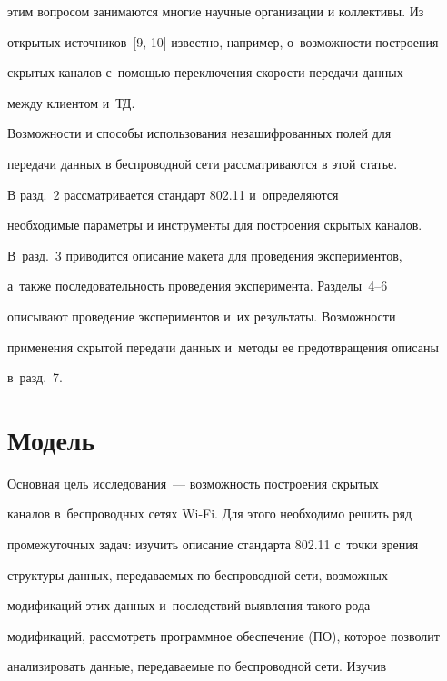 этим вопросом занимаются многие научные организации и коллективы. Из


открытых источников~[9, 10] известно, например, о~возможности построения


скрытых каналов с~по\-мощью переключения скорости передачи данных


между клиентом и~ТД.





  Возможности и способы использования незашифрованных полей для


передачи данных в беспроводной сети рассматриваются в этой статье.





  В разд.~2 рассматривается стандарт 802.11 и~определяются


необходимые параметры и инструменты для построения скрытых каналов.


В~разд.~3 приводится описание макета для проведения экспериментов,


а~так\-же последовательность проведения эксперимента. Разделы~4--6


описывают проведение экспериментов и~их результаты. Возможности


применения скрытой передачи данных и~методы ее предотвращения описаны


в~разд.~7.





\section{Модель}





  Основная цель исследования~--- возможность построения скрытых


каналов в~беспроводных сетях Wi-Fi. Для этого необходимо решить ряд


промежуточных задач: изучить описание стандарта 802.11 с~точки зрения


структуры данных, передаваемых по беспроводной сети, возможных


модификаций этих данных и~последствий выявления такого рода


модификаций, рассмотреть программное обеспечение (ПО), которое позволит


анализировать данные, передаваемые по беспроводной сети. Изучив


